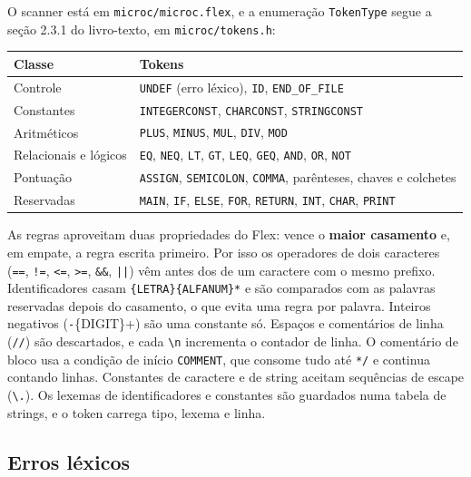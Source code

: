 \documentclass[11pt,a4paper]{article}
\begin{document}
O scanner está em \texttt{microc/microc.flex}, e a enumeração \texttt{TokenType} segue a seção
2.3.1 do livro-texto, em \texttt{microc/tokens.h}:

\begin{center}
\begin{tabular}{@{}lp{10.5cm}@{}}
\toprule
Classe & Tokens \\
\midrule
Controle & \texttt{UNDEF} (erro léxico), \texttt{ID}, \texttt{END\_OF\_FILE} \\
Constantes & \texttt{INTEGERCONST}, \texttt{CHARCONST}, \texttt{STRINGCONST} \\
Aritméticos & \texttt{PLUS}, \texttt{MINUS}, \texttt{MUL}, \texttt{DIV}, \texttt{MOD} \\
Relacionais e lógicos & \texttt{EQ}, \texttt{NEQ}, \texttt{LT}, \texttt{GT}, \texttt{LEQ},
  \texttt{GEQ}, \texttt{AND}, \texttt{OR}, \texttt{NOT} \\
Pontuação & \texttt{ASSIGN}, \texttt{SEMICOLON}, \texttt{COMMA}, parênteses, chaves e colchetes \\
Reservadas & \texttt{MAIN}, \texttt{IF}, \texttt{ELSE}, \texttt{FOR}, \texttt{RETURN},
  \texttt{INT}, \texttt{CHAR}, \texttt{PRINT} \\
\bottomrule
\end{tabular}
\end{center}

As regras aproveitam duas propriedades do Flex: vence o \textbf{maior casamento} e, em empate, a
regra escrita primeiro. Por isso os operadores de dois caracteres (\texttt{==}, \texttt{!=},
\texttt{<=}, \texttt{>=}, \texttt{\&\&}, \texttt{||}) vêm antes dos de um caractere com o mesmo
prefixo. Identificadores casam \texttt{\{LETRA\}\{ALFANUM\}*} e são comparados com as palavras
reservadas depois do casamento, o que evita uma regra por palavra. Inteiros negativos
(\texttt{-}\{DIGIT\}+) são uma constante só. Espaços e comentários de linha (\texttt{//}) são
descartados, e cada \texttt{\textbackslash n} incrementa o contador de linha. O comentário de
bloco usa a condição de início \texttt{COMMENT}, que consome tudo até \texttt{*/} e continua
contando linhas. Constantes de caractere e de string aceitam sequências de escape
(\texttt{\textbackslash.}). Os lexemas de identificadores e constantes são guardados numa tabela
de strings, e o token carrega tipo, lexema e linha.

\subsection{Erros léxicos}
\end{document}
